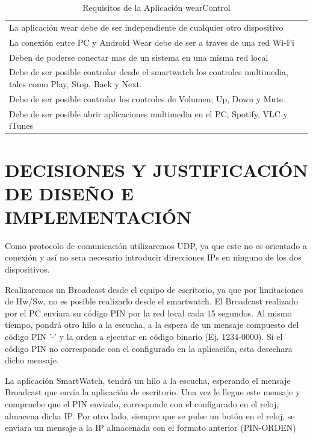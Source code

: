 \documentclass{documentation}
\begin{document}
\begin{table}[hp]
  \centering
  \caption{Requisitos de la Aplicación wearControl}
  \label{tab:competencias}

  \begin{tabular}{p{}}
    \hline
    La aplicación wear debe de ser independiente de cualquier otro dispositivo\\
    La conexión entre PC y Android Wear debe de ser a traves de una red Wi-Fi\\
    Deben de poderse conectar mas de un sistema en una misma red local\\
    Debe de ser posible controlar desde el smartwatch los controles multimedia, tales como Play, Stop, Back y Next.\\
    Debe de ser posible controlar los controles de Volumen; Up, Down y Mute. \\
    Debe de ser posible abrir aplicaciones multimedia en el PC, Spotify, VLC y iTunes \\
    \hline
  \end{tabular}
\end{table}

\newpage
\section{DECISIONES Y JUSTIFICACIÓN DE DISEÑO E IMPLEMENTACIÓN}

Como protocolo de comunicación utilizaremos UDP, ya que este no es orientado a conexión y así no sera necesario introducir direcciones IPs en ninguno de los dos dispositivos.
\newline
\par
\noindent
Realizaremos un Broadcast desde el equipo de escritorio, ya que por limitaciones de Hw/Sw, no es posible realizarlo desde el smartwatch. El Broadcast realizado por el PC enviara su código PIN por la red local cada 15 segundos. Al mismo tiempo, pondrá otro hilo a la escucha, a la espera de un mensaje compuesto del código PIN '-' y la orden a ejecutar en código binario (Ej. 1234-0000). Si el código PIN no corresponde con el configurado en la aplicación, esta desechara dicho mensaje.
\newline
\par
\noindent
La aplicación SmartWatch, tendrá un hilo a la escucha, esperando el mensaje Broadcast que envía la aplicación de escritorio. Una vez le llegue este mensaje y compruebe que el PIN enviado, corresponde con el configurado en el reloj, almacena dicha IP. Por otro lado, siempre que se pulse un botón en el reloj, se enviara un mensaje a la IP almacenada con el formato anterior (PIN-ORDEN)
\end{document}
